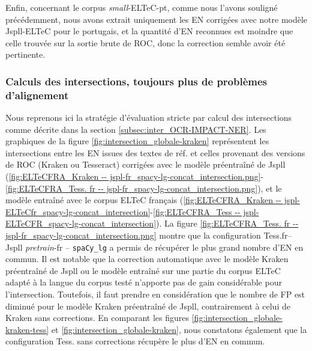   
Enfin, concernant le corpus \textit{small}-ELTeC-pt, comme nous l'avons souligné précédemment, nous avons extrait uniquement les EN corrigées avec notre modèle Jspll-ELTeC pour le portugais, et la quantité d'EN reconnues est moindre que celle trouvée sur la sortie brute de ROC, donc la correction semble avoir été pertinente.

\subsubsection{Calculs des intersections, toujours plus de problèmes d'alignement}

Nous reprenons ici la stratégie d'évaluation stricte par calcul des intersections comme décrite dans la section \ref{subsec:inter_OCR-IMPACT-NER}.
Les graphiques de la figure \ref{fig:intersection_globale-kraken} représentent les intersections entre les EN issues des textes de réf. et celles provenant des versions de ROC (Kraken ou Tesseract) corrigées avec le modèle préentraîné de Jspll (\ref{fig:ELTeCFRA_Kraken -- jspl-fr_spacy-lg-concat_intersection.png}-\ref{fig:ELTeCFRA_Tess. fr -- jspl-fr_spacy-lg-concat_intersection.png}), et le modèle entraîné avec le corpus ELTeC français (\ref{fig:ELTeCFRA_Kraken -- jspl-ELTeCfr_spacy-lg-concat_intersection}-\ref{fig:ELTeCFRA_Tess -- jspl-ELTeCFR_spacy-lg-concat_intersection}). 
La figure \ref{fig:ELTeCFRA_Tess. fr -- jspl-fr_spacy-lg-concat_intersection.png} montre que la configuration Tess.fr--Jspll \textit{pretrain}-fr -- \texttt{spaCy\_lg} a permis de récupérer le plus grand nombre d'EN en commun. Il est notable que la correction automatique avec le modèle Kraken préentraîné de Jspll ou le modèle entraîné sur une partie du corpus ELTeC adapté à la langue du corpus testé n'apporte pas de gain considérable pour l'intersection. Toutefois, il faut prendre en considération que le nombre de FP est diminué pour le modèle Kraken préentraîné de Jspll, contrairement à celui de Kraken sans corrections. En comparant les figures \ref{fig:intersection_globale-kraken-tess} et \ref{fig:intersection_globale-kraken}, nous constatons également que la configuration Tess. sans corrections récupère le plus d'EN en commun. 

